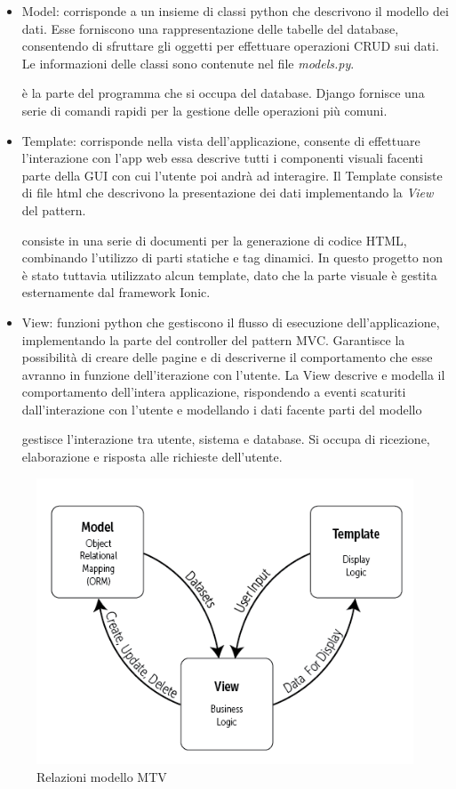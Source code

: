 \documentclass{article}
\begin{document}
\begin{itemize}
\item Model: corrisponde a un insieme di classi python che descrivono il modello dei dati. Esse forniscono una rappresentazione delle tabelle del database, consentendo di sfruttare gli oggetti per effettuare operazioni CRUD sui dati. Le informazioni delle classi sono contenute nel file \textit{models.py}.


è la parte del programma che si occupa del database. Django fornisce una serie di comandi rapidi per la gestione delle operazioni più comuni.
\item Template: corrisponde nella vista dell'applicazione, consente di effettuare l'interazione con l'app web essa descrive tutti i componenti visuali facenti parte della GUI con cui l'utente poi andrà ad interagire.
Il Template consiste di file html che descrivono la presentazione dei dati implementando la \textit{View} del pattern. 

consiste in una serie di documenti per la generazione di codice HTML, combinando l'utilizzo di parti statiche e tag dinamici. In questo progetto non è stato tuttavia utilizzato alcun template, dato che la parte visuale è gestita esternamente dal framework Ionic. 
\item View: funzioni python che gestiscono il flusso di esecuzione dell'applicazione, implementando la parte del controller del pattern MVC. Garantisce la possibilità di creare delle pagine e di descriverne il comportamento che esse avranno in funzione dell'iterazione con l'utente.
La View descrive e modella il comportamento dell'intera applicazione, rispondendo a eventi scaturiti dall'interazione con l'utente e modellando i dati facente parti del modello


gestisce l'interazione tra utente, sistema e database. Si occupa di ricezione, elaborazione e risposta alle richieste dell'utente.
\end{itemize}
\begin{figure}[!h]
\centering
\includegraphics[scale=0.5]{mtv}
\caption{Relazioni modello MTV}
\end{figure}
\end{document}
